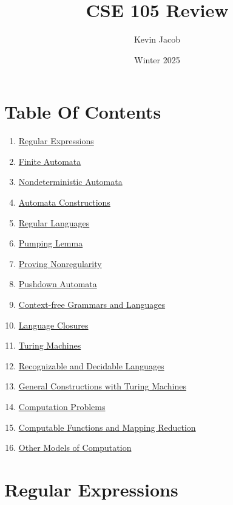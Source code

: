 \documentclass{article}
\title{CSE 105 Review}
\author{Kevin Jacob}
\date{Winter 2025}
\begin{document}
\maketitle
\newpage
\section*{Table Of Contents}
\begin{enumerate}
    \item \hyperref[sec:regExpression]{Regular Expressions}
    \item \hyperref[sec:finiteAutomata]{Finite Automata}
    \item \hyperref[sec:nondeterministicAutomata]{Nondeterministic Automata}
    \item \hyperref[sec:automataConstruct]{Automata Constructions}
    \item \hyperref[sec:regLanguage]{Regular Languages}
    \item \hyperref[sec:pumpLemma]{Pumping Lemma}
    \item \hyperref[sec:proveNonregular]{Proving Nonregularity}
    \item \hyperref[sec:pushdown]{Pushdown Automata}
    \item \hyperref[sec:contextFree]{Context-free Grammars and Languages}
    \item \hyperref[sec:langClose]{Language Closures}
    \item \hyperref[sec:turing]{Turing Machines}
    \item \hyperref[sec:decide]{Recognizable and Decidable Languages}
    \item \hyperref[sec:general]{General Constructions with Turing Machines}
    \item \hyperref[sec:problems]{Computation Problems}
    \item \hyperref[sec:reduction]{Computable Functions and Mapping Reduction}
    \item \hyperref[sec:otherModels]{Other Models of Computation}
\end{enumerate}
\newpage
\section{Regular Expressions}
\label{sec:regExpression}
\end{document}
